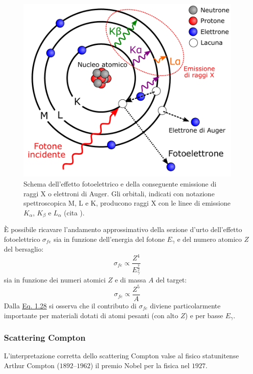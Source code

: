 \documentclass[12pt,a4paper,twoside]{report}
\begin{document}
	\begin{figure}[H]
		\centering
		\includegraphics[width=0.9\linewidth]{fotoelettrico.pdf}
		\caption{Schema dell'effetto fotoelettrico e della conseguente emissione di raggi X o elettroni di Auger. Gli orbitali, indicati con notazione spettroscopica M, L e K, producono raggi X con le linee di emissione $K_\alpha$, $K_\beta$ e $L_\alpha$ (cita
			).}
		\label{fig:fotoelettrico}
	\end{figure}
	\`E possibile ricavare l'andamento approssimativo della sezione d'urto dell'effetto fotoelettrico $\sigma_{fe}$ sia in funzione dell'energia del fotone $E_\gamma$ e del numero atomico $Z$ del bersaglio:
	\begin{equation}
		\sigma_{fe}\propto \frac{Z^4}{E^{\frac{7}{2}}_\gamma}
		\label{eq:sigma_fe1}
	\end{equation}
	sia in funzione dei numeri atomici $Z$ e di massa $A$ del target:
	\begin{equation}
		\sigma_{fe}\propto \frac{Z^5}{A}
		\label{eq:sigma_fe2}
	\end{equation}
	Dalla \hyperref[eq:sigma_fe1]{Eq. 1.28} si osserva che il contributo di $\sigma_{fe}$ diviene particolarmente importante per materiali dotati di atomi pesanti (con alto $Z$) e per basse $E_\gamma$.
	
	\subsubsection{Scattering Compton}
	L'interpretazione corretta dello scattering Compton valse al fisico statunitense Arthur Compton ($1892$--$1962$) il premio Nobel per la fisica nel $1927$.
	
\end{document}
